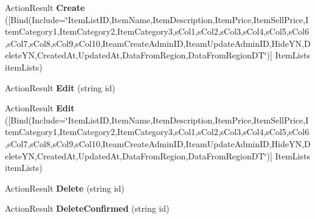 \begin{DoxyCompactItemize}
\item 
Action\+Result {\bfseries Create} (\mbox{[}Bind(Include=\char`\"{}Item\+List\+ID,Item\+Name,Item\+Description,Item\+Price,Item\+Sell\+Price,Item\+Category1,Item\+Category2,Item\+Category3,s\+Col1,s\+Col2,s\+Col3,s\+Col4,s\+Col5,s\+Col6,s\+Col7,s\+Col8,s\+Col9,s\+Col10,Iteam\+Create\+Admin\+ID,Iteam\+Update\+Admin\+ID,Hide\+YN,Delete\+YN,Created\+At,Updated\+At,Data\+From\+Region,Data\+From\+Region\+DT\char`\"{})\mbox{]} Item\+Lists item\+Lists)\hypertarget{class_cloud_bread_admin_web_1_1_controllers_1_1_item_lists_controller_aed59ce39eec3d4b040fae8d055d60dad}{}\label{class_cloud_bread_admin_web_1_1_controllers_1_1_item_lists_controller_aed59ce39eec3d4b040fae8d055d60dad}

\item 
Action\+Result {\bfseries Edit} (string id)\hypertarget{class_cloud_bread_admin_web_1_1_controllers_1_1_item_lists_controller_a3631ffbf29c6c1486b3e0ef45eedd6e9}{}\label{class_cloud_bread_admin_web_1_1_controllers_1_1_item_lists_controller_a3631ffbf29c6c1486b3e0ef45eedd6e9}

\item 
Action\+Result {\bfseries Edit} (\mbox{[}Bind(Include=\char`\"{}Item\+List\+ID,Item\+Name,Item\+Description,Item\+Price,Item\+Sell\+Price,Item\+Category1,Item\+Category2,Item\+Category3,s\+Col1,s\+Col2,s\+Col3,s\+Col4,s\+Col5,s\+Col6,s\+Col7,s\+Col8,s\+Col9,s\+Col10,Iteam\+Create\+Admin\+ID,Iteam\+Update\+Admin\+ID,Hide\+YN,Delete\+YN,Created\+At,Updated\+At,Data\+From\+Region,Data\+From\+Region\+DT\char`\"{})\mbox{]} Item\+Lists item\+Lists)\hypertarget{class_cloud_bread_admin_web_1_1_controllers_1_1_item_lists_controller_ae80de28ebc8e764bcb0ab2d4a9d16c34}{}\label{class_cloud_bread_admin_web_1_1_controllers_1_1_item_lists_controller_ae80de28ebc8e764bcb0ab2d4a9d16c34}

\item 
Action\+Result {\bfseries Delete} (string id)\hypertarget{class_cloud_bread_admin_web_1_1_controllers_1_1_item_lists_controller_ab61271c6f7ecb200b4eb86c5938192f0}{}\label{class_cloud_bread_admin_web_1_1_controllers_1_1_item_lists_controller_ab61271c6f7ecb200b4eb86c5938192f0}

\item 
Action\+Result {\bfseries Delete\+Confirmed} (string id)\hypertarget{class_cloud_bread_admin_web_1_1_controllers_1_1_item_lists_controller_af176c633ced4148fdc22cbc67db9bd76}{}\label{class_cloud_bread_admin_web_1_1_controllers_1_1_item_lists_controller_af176c633ced4148fdc22cbc67db9bd76}

\end{DoxyCompactItemize}
